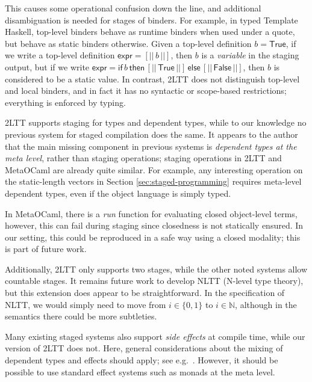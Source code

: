 \documentclass[acmsmall,screen]{acmart}
\newcommand{\msf}[1]{\mathsf{#1}}
\newcommand{\mbb}[1]{\mathbb{#1}}
\newcommand{\True}{\msf{True}}
\newcommand{\False}{\msf{False}}
\theoremstyle{remark}
\begin{document}
This causes some operational confusion down the line, and additional
disambiguation is needed for stages of binders. For example, in typed Template
Haskell, top-level binders behave as runtime binders when used under a quote,
but behave as static binders otherwise. Given a top-level definition $b =
\True$, if we write a top-level definition $\msf{expr} = [||\,b\,||]$, then $b$
is a \emph{variable} in the staging output, but if we write $\msf{expr} =
\msf{if}\,b\,\msf{then}\,[||\,\True\,||]\,\msf{else}\,[||\,\False\,||]$, then
$b$ is considered to be a static value. In contrast, 2LTT does not distinguish
top-level and local binders, and in fact it has no syntactic or scope-based
restrictions; everything is enforced by typing.

2LTT supports staging for types and dependent types, while to our knowledge no
previous system for staged compilation does the same. It appears to the author
that the main missing component in previous systems is \emph{dependent types at
the meta level}, rather than staging operations; staging operations in 2LTT and
MetaOCaml are already quite similar. For example, any interesting operation on
the static-length vectors in Section \ref{sec:staged-programming} requires
meta-level dependent types, even if the object language is simply typed.

In MetaOCaml, there is a \emph{run} function for evaluating closed object-level
terms, however, this can fail during staging since closedness is not statically
ensured. In our setting, this could be reproduced in a safe way using a closed
modality; this is part of future work.


Additionally, 2LTT only supports two stages, while the other noted systems allow
countable stages. It remains future work to develop NLTT (N-level type theory),
but this extension does appear to be straightforward. In the specification of
NLTT, we would simply need to move from $i \in \{0,1\}$ to $i \in \mbb{N}$,
although in the semantics there could be more subtleties.

Many existing staged systems also support \emph{side effects} at compile time,
while our version of 2LTT does not. Here, general considerations about the
mixing of dependent types and effects should apply; see
e.g.\ \cite{fire-triangle}. However, it should be possible to use standard
effect systems such as monads at the meta level.
\end{document}
